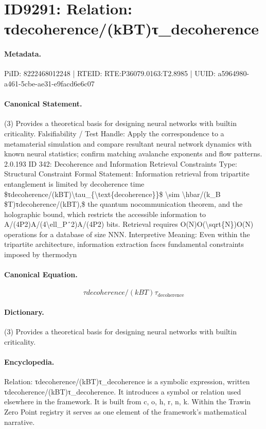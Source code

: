 \section*{ID9291: Relation: τdecoherence/(kBT)τ\_decoherence}
\paragraph{Metadata.}
PiID: 8222468012248 | RTEID: RTE:P36079.0163:T2.8985 | UUID: a5964980-a461-5cbe-ae31-e9facd6e6c07

\paragraph{Canonical Statement.}
(3) Provides a theoretical basis for designing neural networks with builtin criticality. Falsifiability / Test Handle: Apply the correspondence to a metamaterial simulation and compare resultant neural network dynamics with known neural statistics; confirm matching avalanche exponents and flow patterns. 2.0.193 ID 342: Decoherence and Information Retrieval Constraints Type: Structural Constraint Formal Statement: Information retrieval from tripartite entanglement is limited by decoherence time \$τdecoherence/(kBT)\textbackslash{}tau\_\{\textbackslash{}text\{decoherence\}\}\$ \textbackslash{}sim \textbackslash{}hbar/(k\_B \$T)τdecoherence/(kBT),\$ the quantum nocommunication theorem, and the holographic bound, which restricts the accessible information to A/(4P2)A/(4\textbackslash{}ell\_Pˆ2)A/(4P2) bits. Retrieval requires O(N)O(\textbackslash{}sqrt\{N\})O(N) operations for a database of size NNN. Interpretive Meaning: Even within the tripartite architecture, information extraction faces fundamental constraints imposed by thermodyn

\paragraph{Canonical Equation.}
\[
τdecoherence/(kBT)\tau_{\text{decoherence}}
\]

\paragraph{Dictionary.}
(3) Provides a theoretical basis for designing neural networks with builtin criticality.

\paragraph{Encyclopedia.}
Relation: τdecoherence/(kBT)τ\_decoherence is a symbolic expression, written τdecoherence/(kBT)τ\_decoherence. It introduces a symbol or relation used elsewhere in the framework. It is built from c, o, h, r, n, k. Within the Trawin Zero Point registry it serves as one element of the framework's mathematical narrative.

